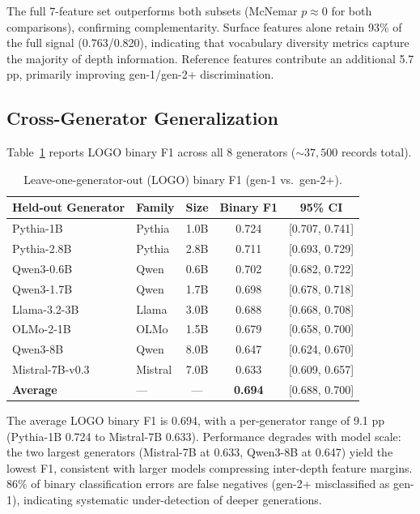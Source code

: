 \documentclass[11pt,a4paper]{article}
\begin{document}
The full 7-feature set outperforms both subsets (McNemar $p \approx 0$ for both comparisons), confirming complementarity. Surface features alone retain 93\% of the full signal (0.763/0.820), indicating that vocabulary diversity metrics capture the majority of depth information. Reference features contribute an additional 5.7 pp, primarily improving gen-1/gen-2+ discrimination.

\subsection{Cross-Generator Generalization}
\label{sec:cross_gen}

Table~\ref{tab:logo} reports LOGO binary F1 across all 8 generators (${\sim}37{,}500$ records total).

\begin{table}[t]
\centering
\small
\caption{Leave-one-generator-out (LOGO) binary F1 (gen-1 vs.\ gen-2+).}
\label{tab:logo}
\begin{tabular}{llccc}
\toprule
Held-out Generator & Family & Size & Binary F1 & 95\% CI \\
\midrule
Pythia-1B & Pythia & 1.0B & 0.724 & [0.707, 0.741] \\
Pythia-2.8B & Pythia & 2.8B & 0.711 & [0.693, 0.729] \\
Qwen3-0.6B & Qwen & 0.6B & 0.702 & [0.682, 0.722] \\
Qwen3-1.7B & Qwen & 1.7B & 0.698 & [0.678, 0.718] \\
Llama-3.2-3B & Llama & 3.0B & 0.688 & [0.668, 0.708] \\
OLMo-2-1B & OLMo & 1.5B & 0.679 & [0.658, 0.700] \\
Qwen3-8B & Qwen & 8.0B & 0.647 & [0.624, 0.670] \\
Mistral-7B-v0.3 & Mistral & 7.0B & 0.633 & [0.609, 0.657] \\
\midrule
\textbf{Average} & --- & --- & \textbf{0.694} & [0.688, 0.700] \\
\bottomrule
\end{tabular}
\end{table}

The average LOGO binary F1 is 0.694, with a per-generator range of 9.1 pp (Pythia-1B 0.724 to Mistral-7B 0.633). Performance degrades with model scale: the two largest generators (Mistral-7B at 0.633, Qwen3-8B at 0.647) yield the lowest F1, consistent with larger models compressing inter-depth feature margins. 86\% of binary classification errors are false negatives (gen-2+ misclassified as gen-1), indicating systematic under-detection of deeper generations.
\end{document}
